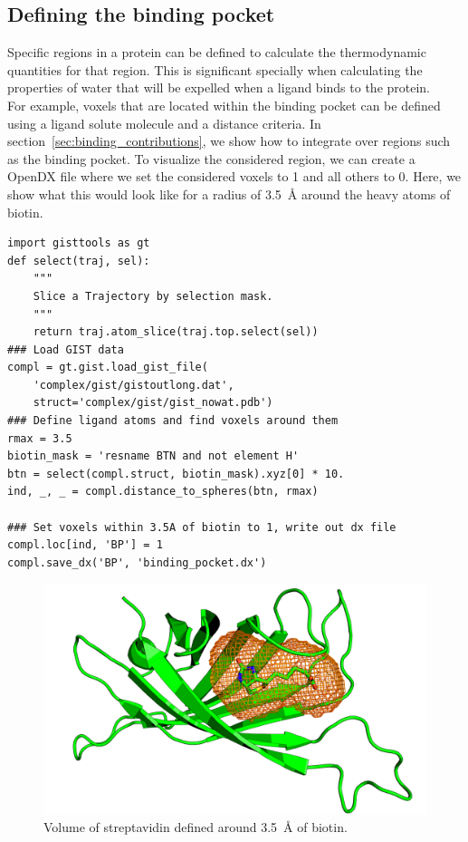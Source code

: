 \documentclass[9pt,tutorial]{livecoms}
\begin{document}
\subsection{Defining the binding pocket}
Specific regions in a protein can be defined to calculate the thermodynamic quantities for that region.
This is significant specially when calculating the properties of water that will be expelled when a ligand binds to the protein.\\
For example, voxels that are located within the binding pocket can be defined using a ligand solute molecule and a distance criteria. 
In section~\ref{sec:binding_contributions}, we show how to integrate over regions such as the binding pocket. To visualize the considered region, we can create a OpenDX file where we set the considered voxels to 1 and all others to 0. Here, we show what this would look like for a radius of \SI{3.5}{\angstrom} around the heavy atoms of biotin. 

\begin{lstlisting}[style=python]
import gisttools as gt
def select(traj, sel):
	""" 
	Slice a Trajectory by selection mask. 
	"""
	return traj.atom_slice(traj.top.select(sel))
### Load GIST data
compl = gt.gist.load_gist_file(
	'complex/gist/gistoutlong.dat', 
	struct='complex/gist/gist_nowat.pdb')
### Define ligand atoms and find voxels around them
rmax = 3.5
biotin_mask = 'resname BTN and not element H'
btn = select(compl.struct, biotin_mask).xyz[0] * 10.
ind, _, _ = compl.distance_to_spheres(btn, rmax)

### Set voxels within 3.5A of biotin to 1, write out dx file
compl.loc[ind, 'BP'] = 1
compl.save_dx('BP', 'binding_pocket.dx')
\end{lstlisting}

\begin{figure}
	\centering
	\includegraphics[width=1.0\linewidth]{streptavidin_bp_close.png}
	\caption{Volume of streptavidin defined around \SI{3.5}{\angstrom} of biotin. }\label{streptavidin_volume}
\end{figure}
\pagebreak %
\end{document}
